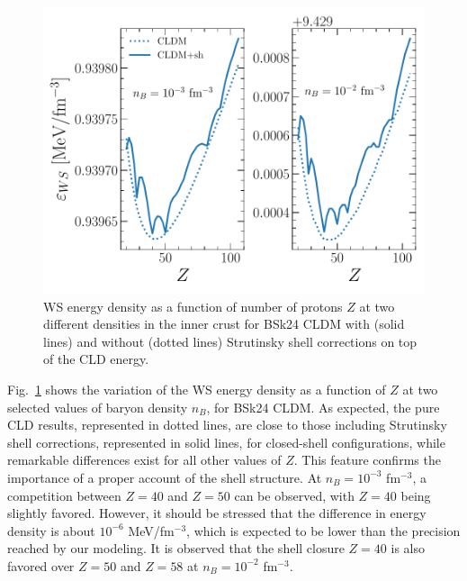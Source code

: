 \begin{figure}[!t]
\begin{center}
  \includegraphics[width=0.9\linewidth]{figures/shcorr_bsk24.pdf}
\end{center}
\caption[Perturbative implementation of proton shell corrections for BSk24]{WS energy density as a function of number of protons $Z$ at two
different densities in the inner crust for BSk24 CLDM with (solid lines) and
without (dotted lines) Strutinsky shell corrections on top of the CLD 
energy.}\label{fig:shcorr_bsk24}
\end{figure}

Fig.~\ref{fig:shcorr_bsk24} shows the variation of the WS energy density as a
function of $Z$ at two selected values of baryon density $n_B$, for BSk24 CLDM. 
As expected, the pure CLD results, represented in dotted lines, are close to 
those including Strutinsky shell corrections, represented in solid lines, for 
closed-shell configurations, while remarkable differences exist for all other 
values of $Z$. This feature confirms the importance of a proper account of the 
shell structure. At $n_B = 10^{-3}$ fm$^{-3}$, a competition between $Z=40$ and
$Z=50$ can be observed, with $Z=40$ being slightly favored. However, it should
be stressed that the difference in energy density is about $10^{-6}$ 
MeV/fm$^{-3}$, which is expected to be lower than the precision reached by our
modeling. It is observed that the shell closure $Z=40$ is also favored over 
$Z=50$ and $Z=58$ at $n_B = 10^{-2}$ fm$^{-3}$.

